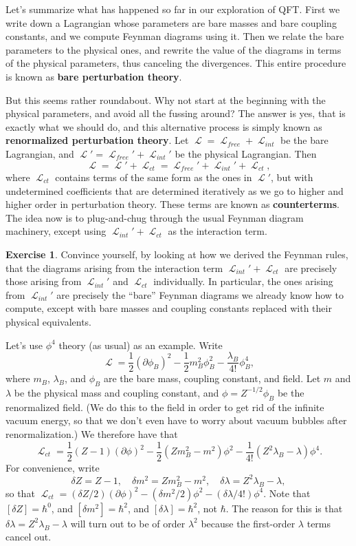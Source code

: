 \documentclass{report}
\theoremstyle{plain}
\theoremstyle{definition}
\newtheorem{exercise}{Exercise}[section]
\theoremstyle{remark}
\DeclareMathOperator{\cL}{\mathcal{L}}
\begin{document}
Let's summarize what has happened so far in our exploration of QFT.
First we write down a Lagrangian whose parameters are bare masses and
bare coupling constants, and we compute Feynman diagrams using it.
Then we relate the bare parameters to the physical ones, and rewrite
the value of the diagrams in terms of the physical parameters, thus
canceling the divergences. This entire procedure is known as {\bf bare
  perturbation theory}.

But this seems rather roundabout. Why not start at the beginning with
the physical parameters, and avoid all the fussing around? The answer
is yes, that is exactly what we should do, and this alternative
process is simply known as {\bf renormalized perturbation theory}. Let
$\cL = \cL_{free} + \cL_{int}$ be the bare Lagrangian, and
$\cL' = \cL_{free}' + \cL_{int}'$ be the physical Lagrangian. Then
$$ \cL = \cL' + \cL_{ct} = \cL_{free}' + \cL_{int}' + \cL_{ct}, $$
where $\cL_{ct}$ contains terms of the same form as the ones in
$\cL'$, but with undetermined coefficients that are determined
iteratively as we go to higher and higher order in perturbation
theory. These terms are known as {\bf counterterms}. The idea now is
to plug-and-chug through the usual Feynman diagram machinery, except
using $\cL_{int}' + \cL_{ct}$ as the interaction term.

\begin{exercise}
  Convince yourself, by looking at how we derived the Feynman rules,
  that the diagrams arising from the interaction term
  $\cL_{int}' + \cL_{ct}$ are precisely those arising from
  $\cL_{int}'$ and $\cL_{ct}$ individually. In particular, the ones
  arising from $\cL_{int}'$ are precisely the ``bare'' Feynman
  diagrams we already know how to compute, except with bare masses and
  coupling constants replaced with their physical equivalents. 
\end{exercise}

Let's use $\phi^4$ theory (as usual) as an example. Write
$$ \cL = \frac{1}{2} (\partial \phi_B)^2 - \frac{1}{2} m_B^2 \phi_B^2 - \frac{\lambda_B}{4!} \phi_B^4, $$
where $m_B$, $\lambda_B$, and $\phi_B$ are the bare mass, coupling
constant, and field. Let $m$ and $\lambda$ be the physical mass and
coupling constant, and $\phi = Z^{-1/2}\phi_B$ be the renormalized
field. (We do this to the field in order to get rid of the infinite
vacuum energy, so that we don't even have to worry about vacuum
bubbles after renormalization.) We therefore have that
$$ \cL_{ct} = \frac{1}{2} (Z-1) (\partial\phi)^2 - \frac{1}{2}(Zm_B^2 - m^2) \phi^2 - \frac{1}{4!} (Z^2 \lambda_B - \lambda) \phi^4. $$
For convenience, write
$$ \delta Z = Z - 1, \quad \delta m^2 = Zm_B^2 - m^2, \quad \delta \lambda = Z^2 \lambda_B - \lambda, $$
so that
$\cL_{ct} = (\delta Z/2)(\partial\phi)^2 - (\delta m^2/2) \phi^2 -
(\delta\lambda/4!)\phi^4$.
Note that $[\delta Z] = \hbar^0$, and $[\delta m^2] = \hbar^2$, and
$[\delta \lambda] = \hbar^2$, not $\hbar$. The reason for this is that
$\delta \lambda = Z^2 \lambda_B - \lambda$ will turn out to be of
order $\lambda^2$ because the first-order $\lambda$ terms cancel out.
\end{document}
